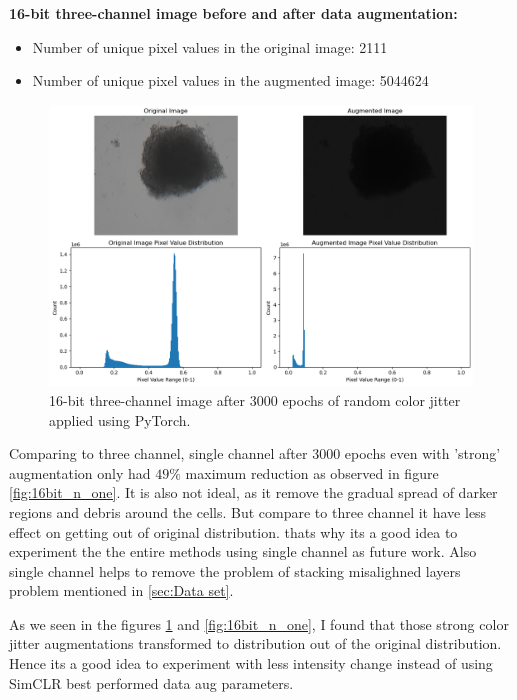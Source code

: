  \textbf{16-bit three-channel image before and after data augmentation:}
  \begin{itemize}
    \item Number of unique pixel values in the original image: 2111
    \item Number of unique pixel values in the augmented image: 5044624
  \end{itemize}
  
  \begin{figure}[H]
    \centering
    \includegraphics[scale=0.5]{figures/16bit_three_1.png} 
    \caption{16-bit three-channel image after 3000 epochs of random color jitter applied using PyTorch.}
    \label{fig:16bit_three_v1}
  \end{figure}

  Comparing to three channel, single channel after 3000 epochs even with 'strong' augmentation only had $49\%$ maximum reduction  as observed in figure 
  \ref{fig:16bit_n_one}. It is also not ideal, as it remove the gradual spread of darker regions and  debris around the cells. But compare to three channel
   it have less effect on getting out of original distribution. thats why its a good idea  to experiment the the entire methods using single channel as future work.
  Also single channel helps to remove the problem of stacking misalighned layers problem mentioned in \ref{sec:Data set}.
   

As we seen in the figures  \ref{fig:16bit_three_v1} and \ref{fig:16bit_n_one}, I found that those strong color jitter augmentations transformed to 
distribution out of the original distribution. Hence its a good idea to experiment with less intensity change instead of using SimCLR best performed data aug parameters.

